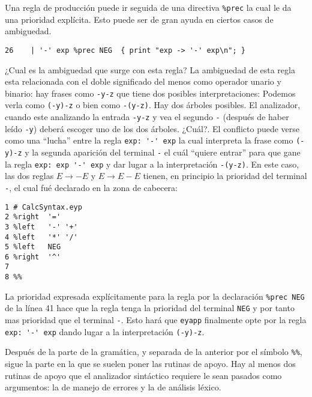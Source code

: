 
Una regla de producción puede ir seguida de una directiva
\verb|%prec| la cual le da una prioridad explícita.  
Esto puede ser de gran ayuda en ciertos casos de 
ambiguedad.

\begin{verbatim}
26    | '-' exp %prec NEG  { print "exp -> '-' exp\n"; }
\end{verbatim}

¿Cual es la ambiguedad que surge con esta regla? 
La ambiguedad de esta regla 
esta relacionada con el doble significado
del menos como operador unario y binario: hay frases
como \verb|-y-z| que tiene dos posibles interpretaciones:
Podemos verla como \verb|(-y)-z| o bien como \verb|-(y-z)|.
Hay dos árboles posibles. El analizador, cuando este analizando
la entrada \verb|-y-z| y vea el
segundo \verb|-| (después de haber leído \verb|-y|)
deberá escoger uno de los dos árboles. 
¿Cuál?. El conflicto puede verse como una ``lucha'' entre
la regla \verb|exp: '-' exp| la cual interpreta la frase como
\verb|(-y)-z| y la segunda aparición del terminal \verb|-| 
el cuál ``quiere entrar'' para que gane la regla \verb|exp: exp '-' exp|
y dar lugar a la interpretación \verb|-(y-z)|.
En este caso, las dos reglas 
$E \rightarrow - E$ y $E \rightarrow E - E$ tienen, en principio
la prioridad del terminal \verb|-|, el cual fué declarado en la
zona de cabecera:
\begin{verbatim}
1 # CalcSyntax.eyp
2 %right  '='
3 %left   '-' '+'
4 %left   '*' '/'
5 %left   NEG
6 %right  '^'
7
8 %%
\end{verbatim}

La prioridad expresada explícitamente
para la regla por la declaración \verb|%prec NEG| de la línea
41 hace que la regla tenga la prioridad
del terminal \verb|NEG| y por tanto mas prioridad
que el terminal \verb|-|. Esto hará que \verb|eyapp| finalmente opte
por la regla \verb|exp: '-' exp| dando lugar a la interpretación
\verb|(-y)-z|.


Después de la parte de la gramática, y separada de la anterior
por el símbolo \verb|%%|, sigue la parte en la que se 
suelen poner las rutinas de apoyo. Hay al menos dos rutinas de apoyo que 
el analizador sintáctico requiere le sean pasados como argumentos: 
la de manejo de errores y la de análisis léxico. 

